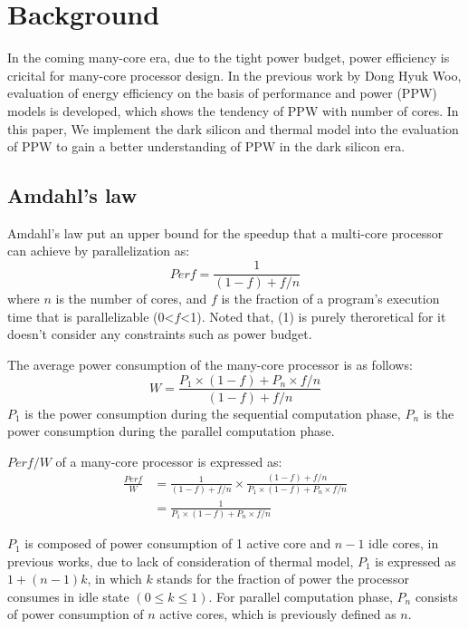 \section{Background}
In the coming many-core era, due to the tight power budget, power efficiency is cricital for many-core processor design. In the previous work by Dong Hyuk Woo, evaluation of energy efficiency on the basis of performance and power (PPW) models is developed, which shows the tendency of PPW with number of cores. In this paper, We implement the dark silicon and thermal model into the evaluation of PPW to gain a better understanding of PPW in the dark silicon era.

\subsection{Amdahl's law}
Amdahl's law put an upper bound for the speedup that a multi-core processor can achieve by parallelization as:
\begin{equation}\label{speedup}
Perf = \frac{1} {(1-f)+f/n}
\end{equation}
where  $n$ is the number of cores, and $f$ is the fraction of a program's execution time that is parallelizable (0<$f$<1). Noted that, (1) is purely theroretical for it doesn't consider any constraints such as power budget.

The average power consumption of the many-core processor is as follows:
\begin{equation}\label{average_power}
W = \frac{P_{1} \times (1-f)+P_{n} \times f/n}{(1-f)+f/n}
\end{equation}
$P_{1}$ is the power consumption during the sequential computation phase, $P_{n}$ is the power consumption during the parallel computation phase.

$Perf/W$ of a many-core processor is expressed as:
\begin{equation}\label{ppw}
\begin{split}
\frac{Perf}{W} &= \frac{1}{(1-f)+f/n} \times \frac{(1-f)+f/n}{P_{1} \times (1-f)+P_{n} \times f/n}\\
&= \frac{1}{P_{1} \times (1-f)+P_{n} \times f/n}
\end{split}
\end{equation}

$P_{1}$ is composed of power consumption of 1 active core and $n-1$ idle cores, in previous works, due to lack of consideration of thermal model, $P_{1}$ is expressed as $1+(n-1)k$, in which $k$ stands for the fraction of power the processor consumes in idle state $(0 \le k \le 1)$. For parallel computation phase, $P_{n}$ consists of power consumption of $n$ active cores, which is previously defined as $n$.

